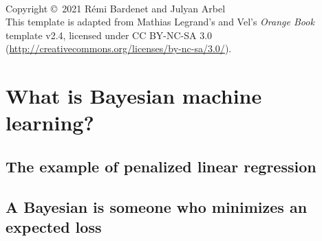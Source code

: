 \documentclass[11pt,fleqn]{book} %
\begin{document}



\newpage
~\vfill
\thispagestyle{empty}

\noindent Copyright \copyright\ 2021 Rémi Bardenet and Julyan Arbel\\ %


\noindent This template is adapted from Mathias Legrand's and Vel's
 \emph{Orange Book} template v2.4, licensed under CC BY-NC-SA 3.0
 (\url{http://creativecommons.org/licenses/by-nc-sa/3.0/}).



\pagestyle{empty} %
\tableofcontents %
\cleardoublepage %
\pagestyle{fancy} %

\part{What is Bayesian machine learning?}
    \chapter{The example of penalized linear regression}
    \chapter{A Bayesian is someone who minimizes an expected loss}
\end{document}
